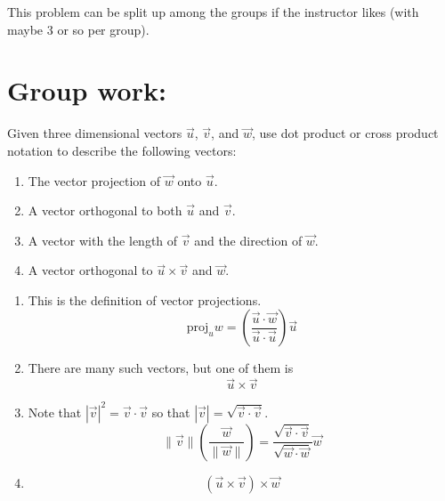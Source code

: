\documentclass[]{ximera}
\begin{document}
\begin{instructorNotes}
This problem can be split up among the groups if the instructor likes (with maybe 3 or so per group).  
\end{instructorNotes}







\section{Group work:}



\begin{problem}
Given three dimensional vectors $\vec{u}$, $\vec{v}$, and $\vec{w}$, use dot product or cross product notation to describe the following vectors:
	\begin{enumerate}
	\item  The vector projection of $\vec{w}$ onto $\vec{u}$.
	
	\item  A vector orthogonal to both $\vec{u}$ and $\vec{v}$.
	
	\item  A vector with the length of $\vec{v}$ and the direction of $\vec{w}$.  
	
	\item  A vector orthogonal to $\vec{u} \times \vec{v}$ and $\vec{w}$.
	\end{enumerate}
	
	\begin{freeResponse}
	\begin{enumerate}
	\item  This is the definition of vector projections.
		\[
		\text{proj}_u w = \boxed{\left( \frac{\vec{u} \cdot \vec{w}}{\vec{u} \cdot \vec{u}} \right) \vec{u}}
		\]
	
	\item  There are many such vectors, but one of them is
		\[
		\boxed{\vec{u} \times \vec{v}}
		\]
	
	\item  Note that $|\vec{v}|^2 = \vec{v} \cdot \vec{v}$ so that $|\vec{v}|=\sqrt{\vec{v} \cdot \vec{v}}$. 
		\[
		\| \vec{v} \| \left( \frac{\vec{w}}{\| \vec{w} \|} \right) = \boxed{ \frac{\sqrt{\vec{v} \cdot \vec{v}}}{\sqrt{\vec{w} \cdot \vec{w}}} \vec{w}}
		\]
	
	\item  
		\[
		\boxed{(\vec{u} \times \vec{v}) \times \vec{w}}
		\]
	\end{enumerate}
	\end{freeResponse}
	
\end{problem}
\end{document}
